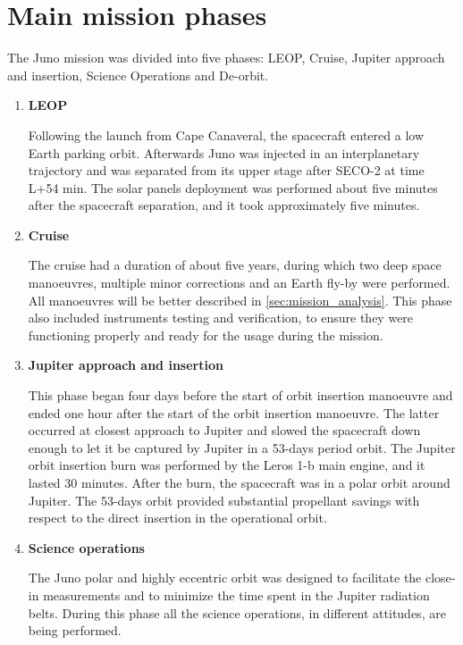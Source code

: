 \section{Main mission phases}
\label{sec:phases}

The Juno mission was divided into five phases: LEOP, Cruise, Jupiter approach and insertion, Science Operations and De-orbit.
\begin{enumerate}
    \item \textbf{LEOP}
    
    Following the launch from Cape Canaveral, the spacecraft entered a low Earth parking orbit. \cite{Juno_launch}
    Afterwards Juno was injected in an interplanetary trajectory and was separated from its upper stage after SECO-2 at time L+54 min.
    The solar panels deployment was performed about five minutes after the spacecraft separation, and it took approximately five minutes.

    \item \textbf{Cruise}
    
    The cruise had a duration of about five years, during which two deep space manoeuvres, multiple minor corrections and an Earth fly-by were performed.
    All manoeuvres will be better described in \autoref{sec:mission_analysis}. This phase also included instruments testing and verification, to ensure they were functioning properly and ready for the usage during the mission. 

    \item \textbf{Jupiter approach and insertion}
    
    This phase began four days before the start of orbit insertion manoeuvre and ended one hour after the start of the orbit insertion manoeuvre. The latter occurred at closest approach to Jupiter and slowed the spacecraft down enough to let it be captured by Jupiter in a 53-days period orbit.
    The Jupiter orbit insertion burn was performed by the Leros 1-b main engine, and it lasted 30 minutes. After the burn, the spacecraft was in a polar orbit around Jupiter.
    The 53-days orbit provided substantial propellant savings with respect to the direct insertion in the operational orbit.

    \item \textbf{Science operations}
    
    The Juno polar and highly eccentric orbit was designed to facilitate the close-in measurements and to minimize the time spent in the Jupiter radiation belts. During this phase all the science operations, in different attitudes, are being performed.


\end{enumerate}
